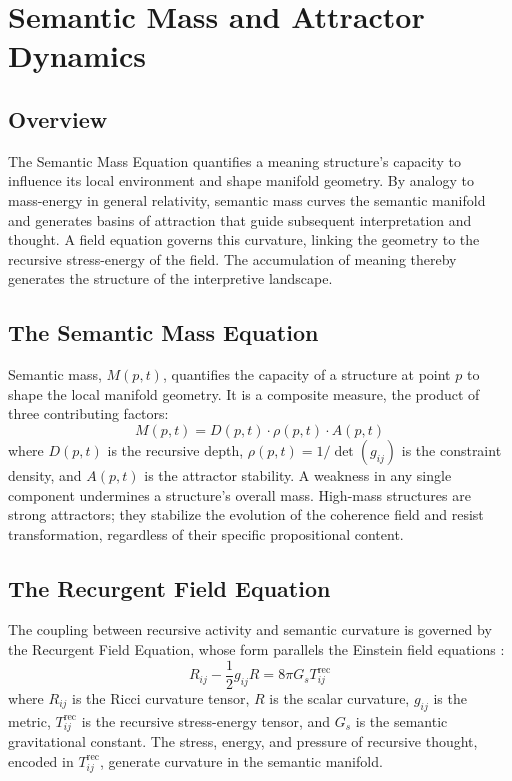 \chapter{Semantic Mass and Attractor Dynamics}

\section{Overview}

The Semantic Mass Equation quantifies a meaning structure's capacity to influence its local environment and shape manifold geometry. By analogy to mass-energy in general relativity, semantic mass curves the semantic manifold and generates basins of attraction that guide subsequent interpretation and thought. A field equation governs this curvature, linking the geometry to the recursive stress-energy of the field. The accumulation of meaning thereby generates the structure of the interpretive landscape.

\section{The Semantic Mass Equation}

Semantic mass, \(M(p,t)\), quantifies the capacity of a structure at point \(p\) to shape the local manifold geometry. It is a composite measure, the product of three contributing factors:
\begin{equation}
M(p, t) = D(p, t) \cdot \rho(p, t) \cdot A(p, t)
\end{equation}
where \(D(p, t)\) is the recursive depth, \(\rho(p, t) = 1/\det(g_{ij})\) is the constraint density, and \(A(p, t)\) is the attractor stability. A weakness in any single component undermines a structure's overall mass. High-mass structures are strong attractors; they stabilize the evolution of the coherence field and resist transformation, regardless of their specific propositional content.

\section{The Recurgent Field Equation}

The coupling between recursive activity and semantic curvature is governed by the Recurgent Field Equation, whose form parallels the Einstein field equations \autocite{Einstein1915, MisnerThorneWheeler1973, Wald1984}:
\begin{equation}
R_{ij} - \frac{1}{2}g_{ij}R = 8\pi G_s T^{\text{rec}}_{ij}
\end{equation}
where \(R_{ij}\) is the Ricci curvature tensor, \(R\) is the scalar curvature, \(g_{ij}\) is the metric, \(T^{\text{rec}}_{ij}\) is the recursive stress-energy tensor, and \(G_s\) is the semantic gravitational constant. The stress, energy, and pressure of recursive thought, encoded in \(T^{\text{rec}}_{ij}\), generate curvature in the semantic manifold.

